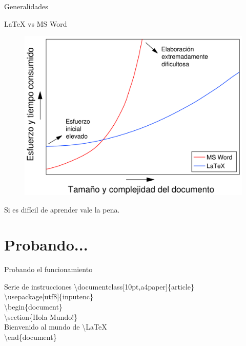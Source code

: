 \begin{frame}{Generalidades}
    \begin{block}{\LaTeX{} vs MS Word}
        \begin{figure}
            \centering
            \includegraphics[scale=.3]{images/LaTeX_vs_Word.pdf}
        \end{figure}
        \begin{center}
            Si es dif\'icil de aprender vale la pena.
        \end{center}
    \end{block}
\end{frame}

\section{Probando...}
\begin{frame}{Probando el funcionamiento}
    \begin{block}{Serie de instrucciones}
        \textbackslash documentclass[10pt,a4paper]\{article\} \\
        \textbackslash usepackage[utf8]\{inputenc\} \\
        \textbackslash begin\{document\} \\
        \textbackslash section\{Hola Mundo!\} \\
        Bienvenido al mundo de \textbackslash LaTeX \\
        \textbackslash end\{document\}
    \end{block}
\end{frame}

